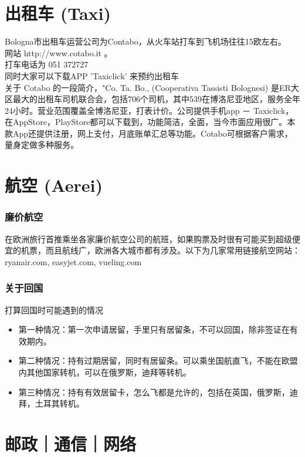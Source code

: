 \documentclass[3pt,a5paper,openright,twoside]{book}
\begin{document}
\section{出租车 (Taxi)}
Bologna市出租车运营公司为Contabo，从火车站打车到飞机场往往15欧左右。\\
网站 http://www.cotabo.it 。\\
打车电话为 051 372727 \\
同时大家可以下载APP 'Taxiclick' 来预约出租车\\
关于 Cotabo 的一段简介，"Co. Ta. Bo., (Cooperativa Tassisti Bolognesi) 是ER大区最大的出租车司机联合会，包括706个司机，其中539在博洛尼亚地区，服务全年24小时。营业范围覆盖全博洛尼亚，打表计价。公司提供手机app － Taxiclick，在AppStore，PlayStore都可以下载到，功能简洁，全面，当今市面应用很广。本款App还提供注册，网上支付，月底账单汇总等功能。Cotabo可根据客户需求，量身定做多种服务。


\section{航空 (Aerei)}

\subsubsection*{廉价航空}
在欧洲旅行首推乘坐各家廉价航空公司的航班，如果购票及时很有可能买到超级便宜的机票，而且航线广，欧洲各大城市都有涉及。以下为几家常用链接航空网站：ryanair.com, easyjet.com, vueling.com


\subsubsection*{关于回国}
打算回国时可能遇到的情况
\begin{itemize}
\item 第一种情况：第一次申请居留，手里只有居留条，不可以回国，除非签证在有效期内。
\item 第二种情况：持有过期居留，同时有居留条。可以乘坐国航直飞，不能在欧盟内其他国家转机，可以在俄罗斯，迪拜等转机。
\item 第三种情况：持有有效居留卡，怎么飞都是允许的，包括在英国，俄罗斯，迪拜，土耳其转机。
\end{itemize}

\section{邮政｜通信｜网络}
\end{document}
